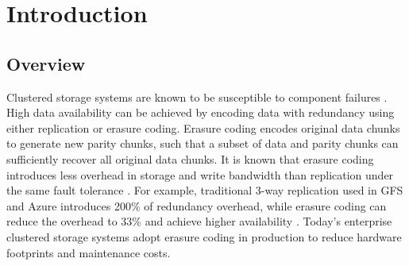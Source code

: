 \chapter{Introduction}
\label{sec:introduction}

\section{Overview}

Clustered storage systems are known to be susceptible to component failures
\cite{ghemawat03}.  High data availability can be achieved by encoding data
with redundancy using either replication or erasure coding.  Erasure coding
encodes original data chunks to generate new parity chunks, such that a subset
of data and parity chunks can sufficiently recover all original data chunks.
It is known that erasure coding introduces less overhead in storage and write
bandwidth than replication under the same fault tolerance
\cite{weatherspoon02,rodrigues05}.  For example, traditional 3-way replication
used in GFS \cite{ghemawat03} and Azure \cite{calder11} introduces 200\% of
redundancy overhead, while erasure coding can reduce the overhead to 33\%
and achieve higher availability \cite{huang12}.  Today's enterprise
clustered storage systems
\cite{welch08,ford10,huang12,sathiamoorthy13,resch11} adopt erasure coding in
production to reduce hardware footprints and maintenance costs.

